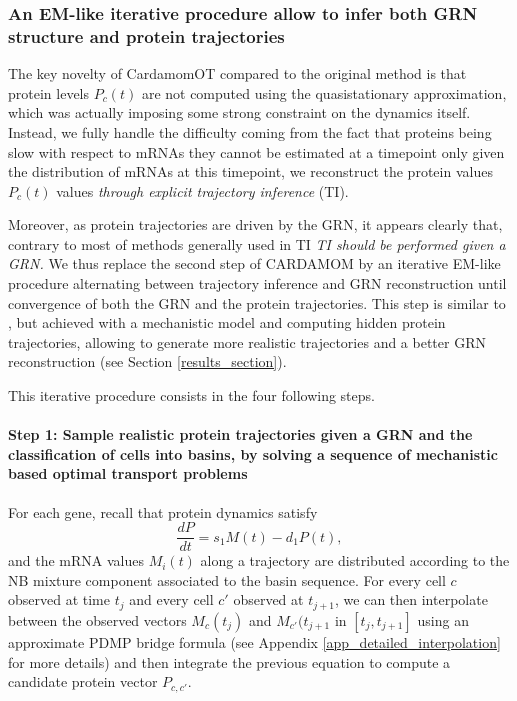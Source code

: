 
\subsubsection{An EM-like iterative procedure allow to infer both GRN structure and protein trajectories}
\label{subsec:Trajectory_and_GRN_inference}

The key novelty of CardamomOT compared to the original method is that protein
levels $P_c(t)$ are not computed using the quasistationary approximation, which was actually imposing some strong constraint on the dynamics itself. Instead, we fully handle the difficulty coming from the fact that proteins being slow with respect to mRNAs they cannot be estimated at a timepoint only given the distribution of mRNAs at this timepoint, we reconstruct the protein values $P_c(t)$ values \emph{through explicit trajectory inference} (TI). 

Moreover, as protein trajectories are driven by the GRN, it appears clearly that, contrary to most of methods generally used in TI \cite{schiebinger2019optimal, rimawi2025simulation} \emph{TI should be performed given a GRN.} We thus replace the second step of CARDAMOM by an iterative EM-like procedure alternating between trajectory inference and GRN reconstruction until convergence of both the GRN and the protein trajectories. This step is similar to \cite{zhang2024joint}, but achieved with a mechanistic model and computing hidden protein trajectories, allowing to generate more realistic trajectories and a better GRN reconstruction (see Section \ref{results_section}).

This iterative procedure consists in the four following steps.

\paragraph{Step 1: Sample realistic protein trajectories given a GRN and the classification of cells into basins, by solving a sequence of mechanistic based optimal transport problems}

For each gene, recall that protein dynamics satisfy
\[
\frac{dP}{dt} = s_{1} M(t) - d_{1} P(t),
\]
and the mRNA values $M_i(t)$ along a trajectory are distributed according to
the NB mixture component associated to the basin sequence. For every cell $c$ observed at time $t_j$ and every cell $c'$ observed at $t_{j+1}$, we can then interpolate between the observed vectors $M_{c}(t_j)$ and $M_{c'}(t_{j+1}$ in $[t_j, t_{j+1}]$ using an approximate PDMP bridge formula (see Appendix \ref{app_detailed_interpolation} for more details) and then integrate the previous equation to compute a candidate protein vector $P_{c,c'}$.


